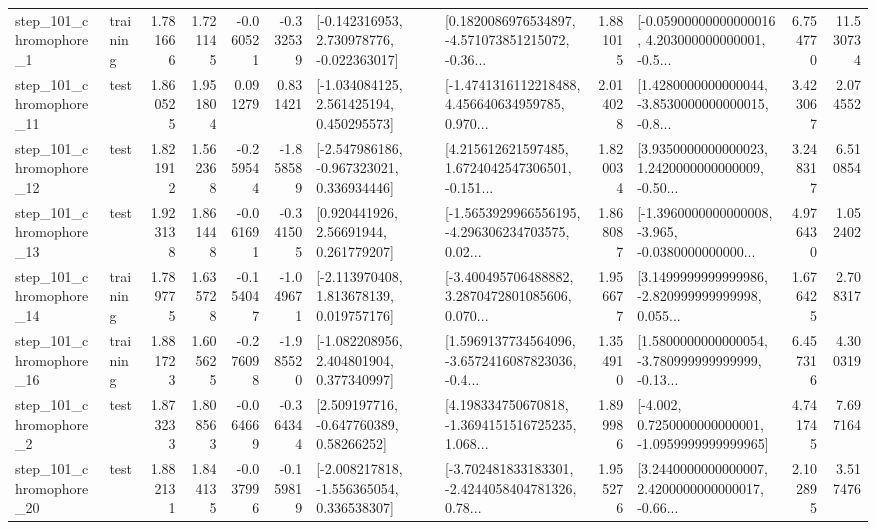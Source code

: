 \begin{tabular}{llrrrrllrlrr}
   step\_101\_chromophore\_1 &  training &      1.781666 &    1.721145 &     -0.060521 & -0.332539 &   [-0.142316953, 2.730978776, -0.022363017] &  [0.1820086976534897, -4.571073851215072, -0.36... &       1.881015 &  [-0.05900000000000016, 4.203000000000001, -0.5... &            6.754770 &         11.530734 \\
  step\_101\_chromophore\_11 &      test &      1.860525 &    1.951804 &      0.091279 &  0.831421 &    [-1.034084125, 2.561425194, 0.450295573] &  [-1.4741316112218488, 4.456640634959785, 0.970... &       2.014028 &  [1.4280000000000044, -3.8530000000000015, -0.8... &            3.423067 &          2.074552 \\
  step\_101\_chromophore\_12 &      test &      1.821912 &    1.562368 &     -0.259544 & -1.858589 &   [-2.547986186, -0.967323021, 0.336934446] &  [4.215612621597485, 1.6724042547306501, -0.151... &       1.820034 &  [3.9350000000000023, 1.2420000000000009, -0.50... &            3.248317 &          6.510854 \\
  step\_101\_chromophore\_13 &      test &      1.923138 &    1.861448 &     -0.061691 & -0.341505 &      [0.920441926, 2.56691944, 0.261779207] &  [-1.5653929966556195, -4.296306234703575, 0.02... &       1.868087 &  [-1.3960000000000008, -3.965, -0.0380000000000... &            4.976430 &          1.052402 \\
  step\_101\_chromophore\_14 &  training &      1.789775 &    1.635728 &     -0.154047 & -1.049671 &    [-2.113970408, 1.813678139, 0.019757176] &  [-3.400495706488882, 3.2870472801085606, 0.070... &       1.956677 &  [3.1499999999999986, -2.820999999999998, 0.055... &            1.676425 &          2.708317 \\
  step\_101\_chromophore\_16 &  training &      1.881723 &    1.605625 &     -0.276098 & -1.985520 &    [-1.082208956, 2.404801904, 0.377340997] &  [1.5969137734564096, -3.6572416087823036, -0.4... &       1.354910 &  [1.5800000000000054, -3.780999999999999, -0.13... &            6.457316 &          4.300319 \\
   step\_101\_chromophore\_2 &      test &      1.873233 &    1.808563 &     -0.064669 & -0.364344 &     [2.509197716, -0.647760389, 0.58266252] &  [4.198334750670818, -1.3694151516725235, 1.068... &       1.899986 &  [-4.002, 0.7250000000000001, -1.0959999999999965] &            4.741745 &          7.697164 \\
  step\_101\_chromophore\_20 &      test &      1.882131 &    1.844135 &     -0.037996 & -0.159819 &   [-2.008217818, -1.556365054, 0.336538307] &  [-3.702481833183301, -2.4244058404781326, 0.78... &       1.955276 &  [3.2440000000000007, 2.4200000000000017, -0.66... &            2.102895 &          3.517476 \\

\end{tabular}
